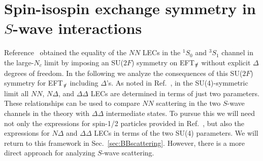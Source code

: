 \documentclass[nofootinbib, preprint, aps, prc, superscriptaddress,11pt]{revtex4-1}
\newcommand{\Nc}{\ensuremath{N_c}\xspace}
\newcommand{\NN}{\ensuremath{N\!N}\xspace}
\newcommand{\oneS}{\ensuremath{{{}^{1}\!S_0}}\xspace}
\newcommand{\threeS}{\ensuremath{{{}^{3}\!S_1}}\xspace}
\newcommand\Swave{$S$-wave\xspace}
\newcommand{\1}{\mathbbm{1}}
\newcommand{\nopi}{\ensuremath{\pi\hskip-0.40em /}}
\newcommand{\eftnopi}{EFT$_{\nopi}$\xspace}
\newcommand{\D}{\ensuremath{\Delta}\xspace}
\newcommand{\DD}{\ensuremath{\Delta\Delta}\xspace}
\newcommand{\ND}{\ensuremath{N\!\Delta}\xspace}
\begin{document}
\section{Spin-isospin exchange symmetry in \Swave interactions}
\label{sec:flip}

Reference~\cite{Kaplan:1995yg} obtained the equality of the \NN LECs in the \oneS and \threeS channel in the large-\Nc limit by imposing an SU($2F$) symmetry on \eftnopi without explicit \D degrees of freedom. In the following we analyze the consequences of this SU($2F$) symmetry for \eftnopi including \D's.
As noted in Ref.~\cite{Kaplan:1995yg}, in the SU(4)-symmetric limit all $\NN$, \ND, and $\DD$ LECs are determined in terms of just two parameters.
These relationships can be used to compare \NN scattering in the two \Swave channels in the theory with \DD intermediate states.  
To pursue this we will need not only the expressions for spin-1/2 particles provided in Ref.~\cite{Kaplan:1995yg}, but also the expressions for \ND and \DD LECs in terms of the two SU(4) parameters. 
We will return to this framework in Sec.~\ref{sec:BBscattering}. However, there is a more direct approach for analyzing \Swave scattering.
\end{document}
